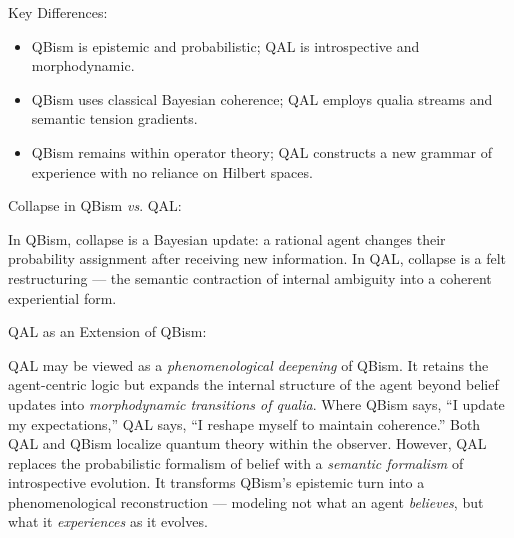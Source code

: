 \documentclass[11pt]{article}
\numberwithin{equation}{section} %
\begin{document}
\bigskip

\noindent Key Differences:
\begin{itemize}
  \item QBism is epistemic and probabilistic; QAL is introspective and morphodynamic.
  \item QBism uses classical Bayesian coherence; QAL employs qualia streams and semantic tension gradients.
  \item QBism remains within operator theory; QAL constructs a new grammar of experience with no reliance on Hilbert spaces.
\end{itemize}

\bigskip

\noindent Collapse in QBism \textit{vs}. QAL:

In QBism, collapse is a Bayesian update: a rational agent changes their probability assignment after receiving new information. In QAL, collapse is a felt restructuring — the semantic contraction of internal ambiguity into a coherent experiential form.

\bigskip

\noindent QAL as an Extension of QBism:

QAL may be viewed as a \textit{phenomenological deepening} of QBism. It retains the agent-centric logic but expands the internal structure of the agent beyond belief updates into \textit{morphodynamic transitions of qualia}. Where QBism says, “I update my expectations,” QAL says, “I reshape myself to maintain coherence.” Both QAL and QBism localize quantum theory within the observer. However, QAL replaces the probabilistic formalism of belief with a \textit{semantic formalism} of introspective evolution. It transforms QBism’s epistemic turn into a phenomenological reconstruction — modeling not what an agent \textit{believes}, but what it \textit{experiences} as it evolves.
\end{document}
